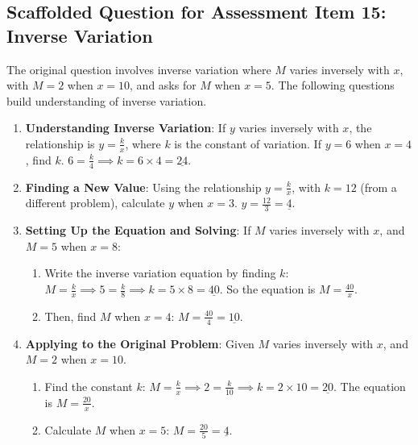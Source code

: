\documentclass[12pt]{article}
\begin{document}
\subsection*{Scaffolded Question for Assessment Item 15: Inverse Variation}
The original question involves inverse variation where \( M \) varies inversely with \( x \), with \( M = 2 \) when \( x = 10 \), and asks for \( M \) when \( x = 5 \). The following questions build understanding of inverse variation.

\begin{enumerate}[label=15.\arabic*]
    \item \textbf{Understanding Inverse Variation}: If \( y \) varies inversely with \( x \), the relationship is \( y = \frac{k}{x} \), where \(k\) is the constant of variation.
    If \( y = 6 \) when \( x = 4 \), find \( k \).
    \( 6 = \frac{k}{4} \implies k = 6 \times 4 = \underline{24} \).
    \item \textbf{Finding a New Value}: Using the relationship \( y = \frac{k}{x} \), with \( k = 12 \) (from a different problem), calculate \( y \) when \( x = 3 \).
    \( y = \frac{12}{3} = \underline{4} \).
    \item \textbf{Setting Up the Equation and Solving}: If \( M \) varies inversely with \( x \), and \( M = 5 \) when \( x = 8 \):
    \begin{enumerate}[label=\alph*)]
        \item Write the inverse variation equation by finding \( k \):
        \( M = \frac{k}{x} \implies 5 = \frac{k}{8} \implies k = 5 \times 8 = \underline{40} \).
        So the equation is \( M = \frac{40}{x} \).
        \item Then, find \( M \) when \( x = 4 \):
        \( M = \frac{40}{4} = \underline{10} \).
    \end{enumerate}
    \item \textbf{Applying to the Original Problem}: Given \( M \) varies inversely with \( x \), and \( M = 2 \) when \( x = 10 \).
    \begin{enumerate}[label=\alph*)]
        \item Find the constant \( k \):
        \( M = \frac{k}{x} \implies 2 = \frac{k}{10} \implies k = 2 \times 10 = \underline{20} \).
        The equation is \( M = \frac{20}{x} \).
        \item Calculate \( M \) when \( x = 5 \):
        \( M = \frac{20}{5} = \underline{4} \).
    \end{enumerate}
\end{enumerate}
\end{document}
